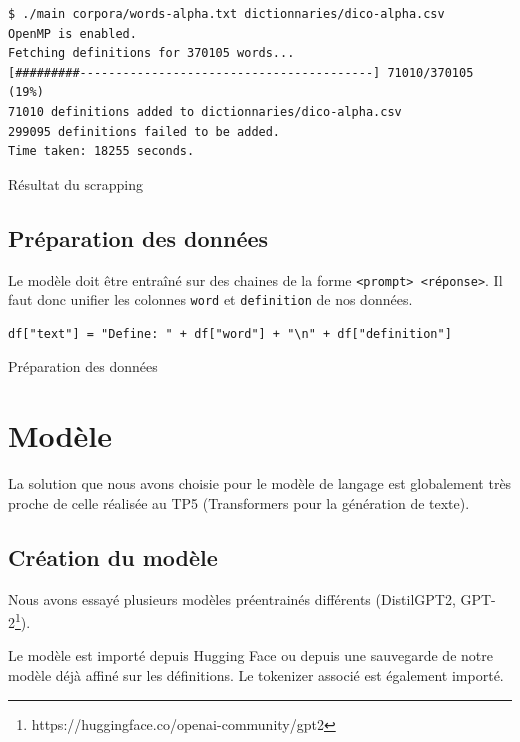 \documentclass[french]{template}
\begin{document}
\begin{listing}[H]
    \begin{verbatim}
$ ./main corpora/words-alpha.txt dictionnaries/dico-alpha.csv
OpenMP is enabled.
Fetching definitions for 370105 words...
[#########-----------------------------------------] 71010/370105 (19%)
71010 definitions added to dictionnaries/dico-alpha.csv
299095 definitions failed to be added.
Time taken: 18255 seconds.
\end{verbatim}
    \caption{Résultat du scrapping}
    \label{listing:scrapping}
\end{listing}

\subsection{Préparation des données}

Le modèle doit être entraîné sur des chaines de la forme \texttt{\textless prompt\textgreater\ \textless réponse\textgreater}. Il faut donc unifier les colonnes \texttt{word} et \texttt{definition} de nos données.

\begin{listing}[H]
    \begin{verbatim}
df["text"] = "Define: " + df["word"] + "\n" + df["definition"]
\end{verbatim}
    \caption{Préparation des données}
\end{listing}

\section{Modèle}

La solution que nous avons choisie pour le modèle de langage est globalement très proche de celle réalisée au TP5 (Transformers pour la génération de texte).

\subsection{Création du modèle}

Nous avons essayé plusieurs modèles préentrainés différents (DistilGPT2, GPT-2\footnote{https://huggingface.co/openai-community/gpt2}).

Le modèle est importé depuis Hugging Face ou depuis une sauvegarde de notre modèle déjà affiné sur les définitions. Le tokenizer associé est également importé.
\end{document}
